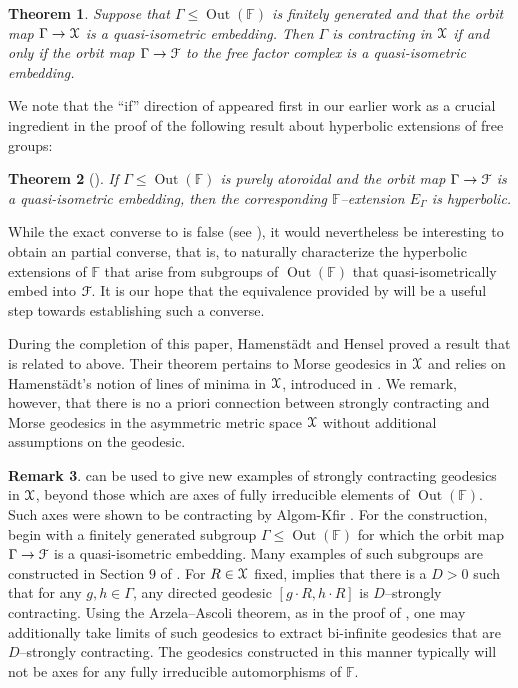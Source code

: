 \documentclass[letterpaper,fleqn]{article}
\theoremstyle{plain}
\newtheorem{theorem}{Theorem}[section]
\theoremstyle{definition}
\newtheorem{remark}[theorem]{Remark}
\DeclareMathOperator{\Out}{Out}
\newcommand{\free}{\mathbb{F}} %
\newcommand{\factor}{{\EuScript F}} %
\newcommand{\F}{\factor} %
\newcommand{\fc}{\factor} %
\newcommand{\os}{{\EuScript X}} %
\newcommand{\X}{\os}
\begin{document}
\begin{theorem}\label{th:contracting_orbit}
Suppose that $\Gamma \le \Out(\free)$ is finitely generated and that the orbit map $\Gamma \to \X$ is a quasi-isometric embedding. Then $\Gamma$ is contracting in $\os$ if and only if the orbit map $\Gamma\to\fc$ to the free factor complex is a quasi-isometric embedding.
\end{theorem}

We note that the ``if'' direction of  appeared first in our earlier work \cite{DT1} as a crucial ingredient in the proof of the following result about hyperbolic extensions of free groups:

\begin{theorem}[{\cite[Theorem 1.1]{DT1}}] \label{th:hyp_extns}
If $\Gamma\le\Out(\free)$ is purely atoroidal and the orbit map $\Gamma\to\fc$ is a quasi-isometric embedding, then the corresponding $\free$--extension $E_\Gamma$ is hyperbolic.
\end{theorem}

While the exact converse to  is false (see \cite[\S1]{DT1}), it would nevertheless be interesting to obtain an partial converse, that is, to naturally characterize the hyperbolic extensions of $\free$ that arise from subgroups of $\Out(\free)$ that quasi-isometrically embed into $\fc$. 
It is our hope that the equivalence provided by  will be a useful step towards establishing such a converse.


During the completion of this paper, Hamenst\"adt and Hensel proved a result \cite[Theorem 3]{hamenstadt2014convex} that is related to  above.
Their theorem pertains to Morse geodesics in $\os$ and relies on Hamenst\"adt's notion of lines of minima in $\X$, introduced in \cite{Hlines}. 
We remark, however, that there is no a priori connection between strongly contracting and Morse geodesics in the asymmetric metric space $\os$ without additional assumptions on the geodesic. 


\begin{remark}
 can be used to give new examples of strongly contracting geodesics in $\X$, beyond those which are axes of fully irreducible elements of $\Out(\free)$. Such axes were shown to be contracting by Algom-Kfir \cite{AKaxis}. For the construction, begin with a finitely generated subgroup $\Gamma \le \Out(\free)$ for which the orbit map $\Gamma \to \F$ is a quasi-isometric embedding. Many examples of such subgroups are constructed in Section $9$ of \cite{DT1}. For $R \in \X$ fixed,  implies that there is a $D >0$ such that for any $g,h \in \Gamma$, any directed geodesic $[g\cdot R,h\cdot R]$ is $D$--strongly contracting. Using the Arzela--Ascoli theorem, as in the proof of \cite[Proposition 5.6]{DKTct}, one may additionally take limits of such geodesics to extract bi-infinite geodesics that are $D$--strongly contracting. The geodesics constructed in this manner typically will not be axes for any fully irreducible automorphisms of $\free$.
\end{remark}
\end{document}
